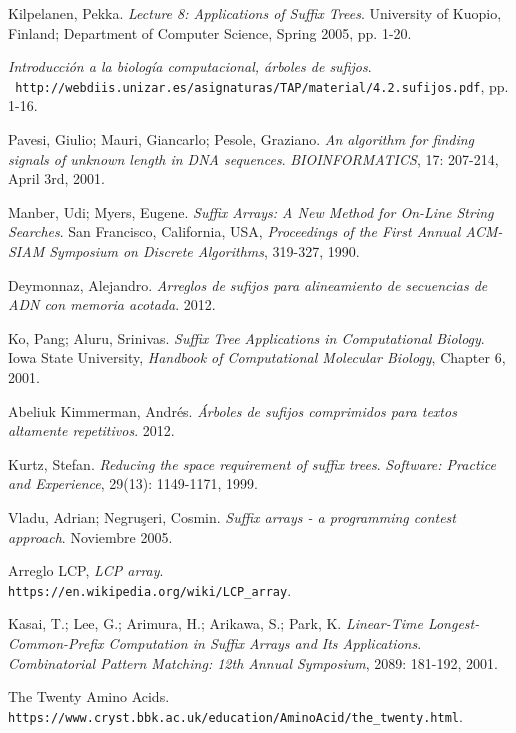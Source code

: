 \documentclass[letterpaper, 10pt, notitlepage]{report}
\begin{document}
\begin{thebibliography}{9}
Kilpelanen, Pekka.
\textit{Lecture 8: Applications of Suffix Trees}. 
University of Kuopio, Finland; Department of Computer Science, Spring 2005, pp. 1-20.


\textit{Introducción a la biología computacional, árboles de sufijos}.
\\\texttt{ http://webdiis.unizar.es/asignaturas/TAP/material/4.2.sufijos.pdf}, pp. 1-16.

 
Pavesi, Giulio; Mauri, Giancarlo; Pesole, Graziano.
\textit{An algorithm for finding signals of unknown length in DNA sequences}. 
\textit{BIOINFORMATICS}, 17: 207-214, April 3rd, 2001.

Manber, Udi; Myers, Eugene.
\textit{Suffix Arrays: A New Method for On-Line String Searches}. San Francisco, California, USA, 
\textit{Proceedings of the First Annual ACM-SIAM Symposium on Discrete Algorithms}, 319-327, 1990.

Deymonnaz, Alejandro.
\textit{Arreglos de sufijos para alineamiento de secuencias de ADN con memoria acotada}. 2012.

Ko, Pang; Aluru, Srinivas.
\textit{Suffix Tree Applications in Computational Biology}. 
Iowa State University, \textit{Handbook of Computational Molecular Biology}, Chapter 6, 2001.

Abeliuk Kimmerman, Andrés.
\textit{Árboles de sufijos comprimidos para textos altamente repetitivos}. 2012.

Kurtz, Stefan.
\textit{Reducing the space requirement of suffix trees}.
\textit{Software: Practice and Experience}, 29(13): 1149-1171, 1999.

Vladu, Adrian; Negru\c{s}eri, Cosmin.
\textit{Suffix arrays - a programming contest approach}. Noviembre 2005.

Arreglo LCP, \textit{LCP array}.
\\\texttt{https://en.wikipedia.org/wiki/LCP\_array}.

Kasai, T.; Lee, G.; Arimura, H.; Arikawa, S.; Park, K.
\textit{Linear-Time Longest-Common-Prefix Computation in Suffix Arrays and Its Applications}.
\textit{Combinatorial Pattern Matching: 12th Annual Symposium}, 2089: 181-192, 2001. 

The Twenty Amino Acids.
\\\texttt{https://www.cryst.bbk.ac.uk/education/AminoAcid/the\_twenty.html}.


\end{thebibliography}
\end{document}
